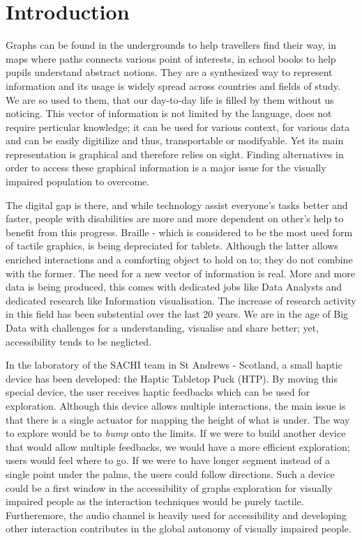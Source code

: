\chapter{Introduction}

Graphs can be found in the undergrounds to help travellers find their
way, in maps where paths connects various point of interests, in school
books to help pupils understand abstract notions. They are a synthesized
way to represent information and its usage is widely spread across
countries and fields of study. We are so used to them, that our
day-to-day life is filled by them without us noticing. This vector of
information is not limited by the language, does not require perticular
knowledge; it can be used for various context, for various data and can
be easily digitilize and thus, transportable or modifyable. Yet its main
representation is graphical and therefore relies on sight. Finding
alternatives in order to access these graphical information is a major
issue for the visually impaired population to overcome. 

The digital gap is there, and while technology assist everyone's tasks
better and faster, people with disabilities are more and more dependent
on other's help to benefit from this progress. Braille - which is
considered to be the most used form of tactile graphics, is being
depreciated for tablets. Although the latter allows enriched
interactions and a comforting object to hold on to; they do not combine
with the former. The need for a new vector of information is real. More
and more data is being produced, this comes with dedicated jobs like
Data Analysts and dedicated research like Information visualisation. The
increase of research activity in this field has been substential over
the last 20 years. We are in the age of Big Data with challenges for a
understanding, visualise and share better; yet, accessibility tends
to be neglicted.

In the laboratory of the SACHI team in St Andrews - Scotland, a small
haptic device has been developed: the Haptic Tabletop Puck (HTP). By
moving this special device, the user receives haptic feedbacks which can
be used for exploration. Although this device allows multiple
interactions, the main issue is that there is a single actuator for
mapping the height of what is under. The way to explore would be to
\emph{bump} onto the limits. If we were to build another device that
would allow multiple feedbacks, we would have a more efficient
exploration; users would feel where to go. If we were to have longer
segment instead of a single point under the palms, the users could follow
directions. Such a device could be a first window in the accessibility
of graphs exploration for visually impaired people as the interaction
techniques would be purely tactile. Furtheremore, the audio channel is
heavily used for accessibility and developing other interaction
contributes in the global autonomy of visually impaired people.

